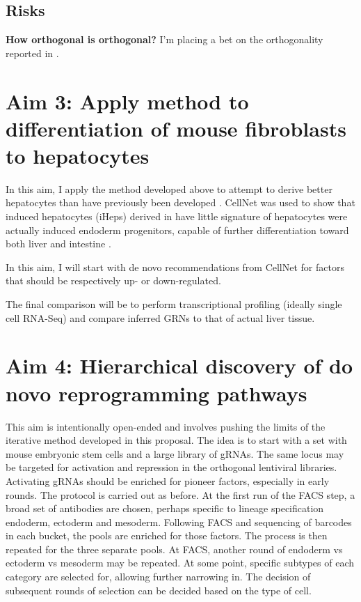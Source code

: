 \documentclass[10pt]{article}
\begin{document}
\subsection{Risks}

\textbf{How orthogonal is orthogonal?} I'm placing a bet on the orthogonality reported in \cite{esvelt2013orthogonal}.

\section{Aim 3: Apply method to differentiation of mouse fibroblasts to hepatocytes}

In this aim, I apply the method developed above to attempt to derive better hepatocytes than have previously been developed \cite{huang2011induction, sekiya2011direct}. CellNet was used to show that induced hepatocytes (iHeps) derived in \cite{sekiya2011direct} have little signature of hepatocytes were actually induced endoderm progenitors, capable of further differentiation toward both liver and intestine \cite{morris2014dissecting}.

In this aim, I will start with de novo recommendations from CellNet for factors that should be respectively up- or down-regulated.

The final comparison will be to perform transcriptional profiling (ideally single cell RNA-Seq) and compare inferred GRNs to that of actual liver tissue.

\section*{Aim 4: Hierarchical discovery of do novo reprogramming pathways}

This aim is intentionally open-ended and involves pushing the limits of the iterative method developed in this proposal. The idea is to start with a set with mouse embryonic stem cells and a large library of gRNAs. The same locus may be targeted for activation and repression in the orthogonal lentiviral libraries. Activating gRNAs should be enriched for pioneer factors, especially in early rounds. The protocol is carried out as before. At the first run of the FACS step, a broad set of antibodies are chosen, perhaps specific to lineage specification endoderm, ectoderm and mesoderm. Following FACS and sequencing of barcodes in each bucket, the pools are enriched for those factors. The process is then repeated for the three separate pools. At FACS, another round of endoderm vs ectoderm vs mesoderm may be repeated. At some point, specific subtypes of each category are selected for, allowing further narrowing in. The decision of subsequent rounds of selection can be decided based on the type of cell.
\end{document}
